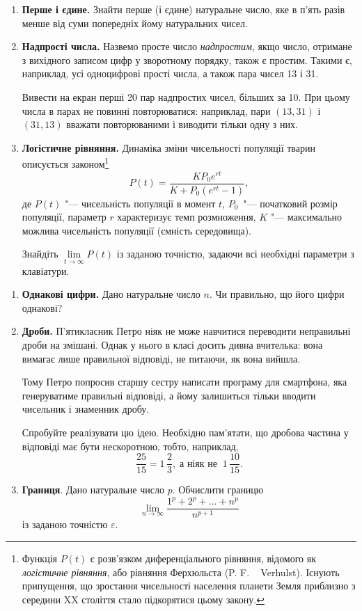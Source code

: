 
\begin{enumerate}
\item \textbf{Перше і єдине.} Знайти перше (і єдине) натуральне число, яке в п'ять разів менше від суми попередніх йому натуральних чисел.
\item \textbf{Надпрості числа.} Назвемо просте число {\itshape надпростим}, якщо число, отримане з вихідного записом цифр у зворотному порядку, також є простим. Такими є, наприклад, усі одноцифрові прості числа, а також пара чисел 13 і 31.

Вивести на екран перші 20 пар надпростих чисел, більших за 10. При цьому числа в парах не повинні повторюватися: наприклад, пари $(13, 31)$ і $(31, 13)$ вважати повторюваними і виводити тільки одну з них.
\item \textbf{Логістичне рівняння.} Динаміка зміни чисельності популяції тварин описується законом\footnote[1]{Функція $P(t)$ є розв'язком диференціального рівняння, відомого як {\itshape логістичне рівняння}, або рівняння Ферхюльста (P. F. ~ Verhulst). Існують припущення, що зростання чисельності населення планети Земля приблизно з середини XX століття стало підкорятися цьому закону.}
$$
P(t)=\frac{KP_0e^{rt}}{K+P_0(e^{rt}-1)},
$$
де $P(t)$ "--- чисельність популяції в момент $t$, $P_0$~"--- початковий розмір популяції, параметр $r$ характеризує темп розмноження, $K$ "--- максимально можлива чисельність популяції (ємність середовища).

Знайдіть $\lim\limits_{t\to\infty}P(t)$ із заданою точністю, задаючи всі необхідні параметри з клавіатури.
\end{enumerate}




\begin{enumerate}
\item \textbf{Однакові цифри.} Дано натуральне число $n$. Чи правильно, що його цифри однакові?

\item \textbf{Дроби.} П'ятикласник Петро ніяк не може навчитися переводити неправильні дроби на змішані. Однак у нього в класі досить дивна вчителька: вона вимагає лише правильної відповіді, не питаючи, як вона вийшла.

Тому Петро попросив старшу сестру написати програму для смартфона, яка генеруватиме правильні відповіді, а йому залишиться тільки вводити чисельник і знаменник дробу.

Спробуйте реалізувати цю ідею. Необхідно пам'ятати, що дробова частина у відповіді має бути нескоротною, тобто, наприклад,
$$
\frac{25}{15}=1\,\frac{2}{3}, \;\text{а ніяк не} \; \; 1\,\frac{10}{15}.
$$
\item \textbf{Границя}. Дано натуральне число $p$. Обчислити границю
$$
\lim_{n\to\infty} \frac{1^p+2^p+\ldots+n^p}{n^{p+1}}
$$
із заданою точністю $\varepsilon$.
\end{enumerate}



